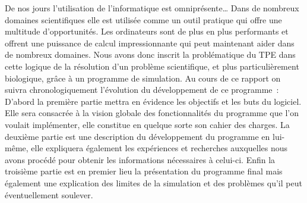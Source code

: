 
De nos jours l’utilisation de l’informatique est omniprésente… Dans de nombreux domaines scientifiques elle est utilisée comme un outil  pratique qui offre une multitude d’opportunités. Les ordinateurs sont de plus en plus performants et offrent une puissance de calcul impressionnante qui peut maintenant aider dans de nombreux domaines. Nous avons donc inscrit la problématique du TPE dans cette logique de la résolution d’un problème scientifique, et plus particulièrement biologique, grâce à un programme de simulation. Au cours de ce rapport on suivra chronologiquement l’évolution du développement de ce programme : D’abord la première partie mettra en évidence les objectifs et les buts du logiciel. Elle sera consacrée à la vision globale des fonctionnalités du programme que l’on voulait implémenter, elle constitue en quelque sorte son cahier des charges. La deuxième partie est une description du développement du programme en lui-même, elle expliquera également les expériences et recherches auxquelles nous avons procédé pour obtenir les informations nécessaires à celui-ci. Enfin la troisième partie est en premier lieu la présentation du programme final mais également une explication des limites de la simulation et des problèmes qu’il peut éventuellement soulever.
